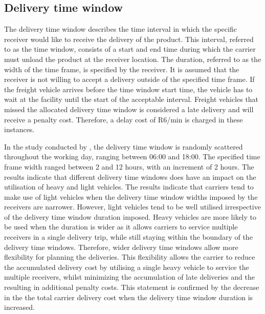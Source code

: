 \subsection{Delivery time window}
The delivery time window describes the time interval in which the specific receiver would like to receive the delivery of the product. This interval, referred to as the time window, consists of a start and end time during which the carrier must unload the product at the receiver location. The duration, referred to as the width of the time frame, is specified by the receiver. It is assumed that the receiver is not willing to accept a delivery outside of the specified time frame. If the freight vehicle arrives before the time window start time, the vehicle has to wait at the facility until the start of the acceptable interval. Freight vehicles that missed the allocated delivery time window is considered a late delivery and will receive a penalty cost. Therefore, a delay cost of R6/min is charged in these instances.\par

In the study conducted by \citet{bean2019behavioural}, the delivery time window is randomly scattered throughout the working day, ranging between 06:00 and 18:00. The specified time frame width ranged between 2 and 12 hours, with an increment of 2 hours. The results indicate that different delivery time windows does have an impact on the utilisation of heavy and light vehicles. The results indicate that carriers tend to make use of light vehicles when the delivery time window widths imposed by the receivers are narrower. However, light vehicles tend to be well utilised irrespective of the delivery time window duration imposed.  Heavy vehicles are more likely to be used when the duration is wider as it allows carriers to service multiple receivers in a single delivery trip, while still staying within the boundary of the delivery time windows. Therefore, wider delivery time windows allow more flexibility for planning the deliveries. This flexibility allows the carrier to reduce the accumulated delivery cost by utilising a single heavy vehicle to service the multiple receivers, whilst minimizing the accumulation of late deliveries and the resulting in additional penalty costs. This statement is confirmed by the decrease in the the total carrier delivery cost when the delivery time window duration is increased. 

